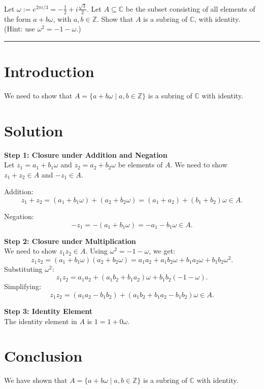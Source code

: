 \documentclass[12pt]{amsart}
\theoremstyle{definition}
\numberwithin{equation}{section}
\newcommand{\Z}{\mathbb{Z}}
\renewcommand{\C}{\mathbb{C}}
\begin{document}
\begin{exercise}{8} Let \(\omega := e^{2 \pi i / 3} = -\frac{1}{2} + i\frac{\sqrt{3}}{2}\). Let \( A \subseteq \C \) be the subset consisting of all elements of the form \(a + b\omega \), with \(a,b \in \Z \). Show that \(A \) is a subring of \(\C \), with identity. (Hint: use \(\omega^2 = -1 - \omega \).)

    \noindent\rule{\linewidth}{1pt}

    \section*{Introduction}
    We need to show that \(A = \{a + b\omega \mid a, b \in \Z \} \) is a subring of \(\C \) with identity.

    \section*{Solution}
    \noindent \textbf{Step 1: Closure under Addition and Negation}\\
    Let \(z_1 = a_1 + b_1 \omega \) and \(z_2 = a_2 + b_2 \omega \) be elements of \(A\). We need to show \(z_1 + z_2 \in A\) and \(-z_1 \in A\).

    Addition:
    \[
    z_1 + z_2 = (a_1 + b_1 \omega) + (a_2 + b_2 \omega) = (a_1 + a_2) + (b_1 + b_2) \omega \in A.
    \]

    Negation:
    \[
    -z_1 = -(a_1 + b_1 \omega) = -a_1 - b_1 \omega \in A.
    \]

    \noindent \textbf{Step 2: Closure under Multiplication}\\
    We need to show \(z_1 z_2 \in A\). Using \(\omega^2 = -1 - \omega \), we get:
    \[
    z_1 z_2 = (a_1 + b_1 \omega)(a_2 + b_2 \omega) = a_1 a_2 + a_1 b_2 \omega + b_1 a_2 \omega + b_1 b_2 \omega^2.
    \]
    Substituting \(\omega^2\):
    \[
    z_1 z_2 = a_1 a_2 + (a_1 b_2 + b_1 a_2) \omega + b_1 b_2 (-1 - \omega).
    \]
    Simplifying:
    \[
    z_1 z_2 = (a_1 a_2 - b_1 b_2) + (a_1 b_2 + b_1 a_2 - b_1 b_2) \omega \in A.
    \]

    \noindent \textbf{Step 3: Identity Element}\\
    The identity element in \(A\) is \(1 = 1 + 0 \omega \).

    \section*{Conclusion}
    We have shown that \(A = \{a + b\omega \mid a, b \in \Z \} \) is a subring of \(\C \) with identity.

\end{exercise}
\end{document}
